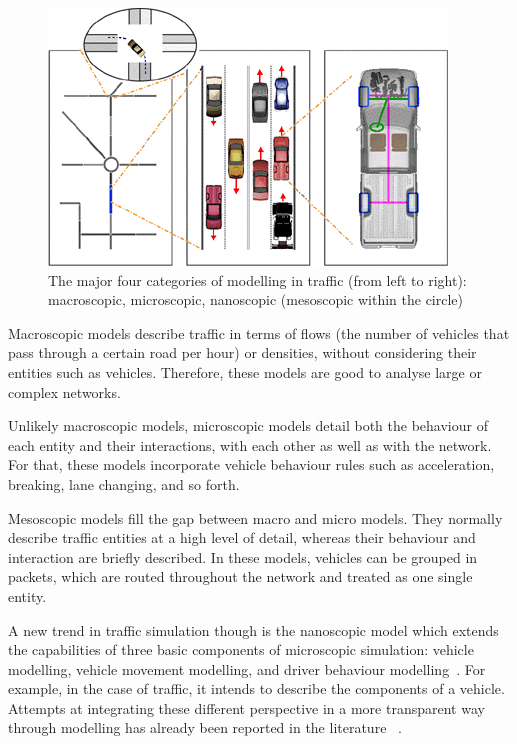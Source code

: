 \documentclass[conference]{IEEEtran}
\begin{document}
\begin{figure}[h!]
\centering
\includegraphics[width=.9\linewidth]{traffic_models.png}
\caption{The major four categories of modelling in traffic (from left to right): macroscopic, microscopic, nanoscopic (mesoscopic within the circle)~\cite{krajzewicz2002sumo}}
\label{fig:traffic_models}
\vspace{-0.9em}
\end{figure}

Macroscopic models describe traffic in terms of flows (the number of vehicles that pass through a certain road per hour) or densities, without considering their entities such as vehicles. Therefore, these models are good to analyse large or complex networks.

Unlikely macroscopic models, microscopic models detail both the behaviour of each entity and their interactions, with each other as well as with the network. For that, these models incorporate vehicle behaviour rules such as acceleration, breaking, lane changing, and so forth.

Mesoscopic models fill the gap between macro and micro models. They normally describe traffic entities at a high level of detail, whereas their behaviour and interaction are briefly described. In these models, vehicles can be grouped in packets, which are routed throughout the network and treated as one single entity.

A new trend in traffic simulation though is the nanoscopic model which extends the capabilities of three basic components of microscopic simulation: vehicle modelling, vehicle movement modelling, and driver behaviour modelling~\cite{dia2008nanoscopic}. For example, in the case of traffic, it intends to describe the components of a vehicle. Attempts at integrating these different perspective in a more transparent way through modelling has already been reported in the literature~\cite{rossetti1999} \cite{ferreira2008}.
\end{document}
